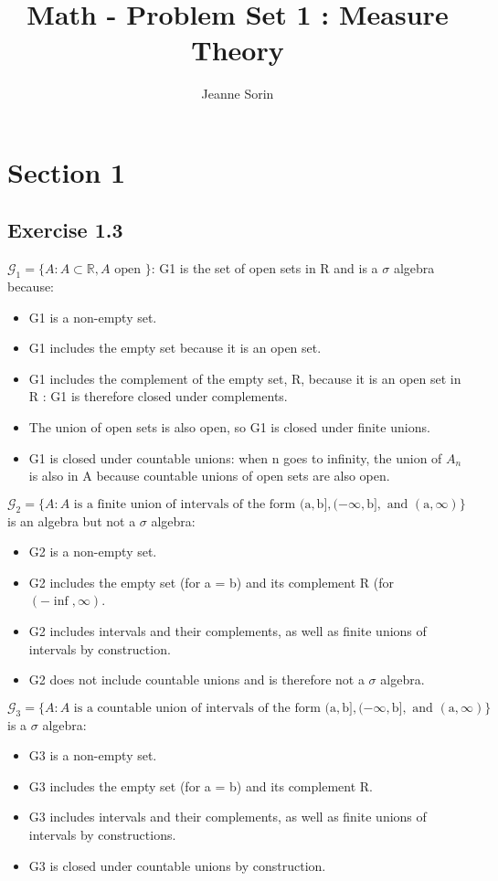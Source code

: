 \documentclass[11pt]{article}
\title{Math - Problem Set 1 : Measure Theory}
\author{Jeanne Sorin}
\numberwithin{equation}{section}
\theoremstyle{plain}
\theoremstyle{definition}
\newcommand{\1}{\mathbbm 1}
\def\s{\sigma}
\begin{document}
\maketitle

\section*{Section 1} %
\label{sec:section_1}

\subsection*{Exercise 1.3} %

\noindent $\mathcal{G}_{1}=\{A : A \subset \mathbb{R}, A \text { open }\}$: G1 is the set of open sets in R and is a $\s$ algebra because:
\begin{itemize}
	\item G1 is a non-empty set.
	\item G1 includes the empty set because it is an open set.
	\item G1 includes the complement of the empty set, R, because it is an open set in R : G1 is therefore closed under complements.
	\item The union of open sets is also open, so G1 is closed under finite unions.
	\item G1 is closed under countable unions: when n goes to infinity, the union of $A_n$ is also in A because countable unions of open sets are also open.
\end{itemize}



\noindent $\mathcal{G}_{2}=\{A : A \text { is a finite union of intervals of the form }(\mathrm{a}, \mathrm{b}],(-\infty, \mathrm{b}], \text { and }(\mathrm{a}, \infty)\}$ is an algebra but not a $\s$ algebra:
\begin{itemize}
	\item G2 is a non-empty set.
	\item G2 includes the empty set (for a = b) and its complement R (for $(-\inf , \infty)$.
	\item G2 includes intervals and their complements, as well as finite unions of intervals by construction.
	\item G2 does not include countable unions and is therefore not a $\s$ algebra.
\end{itemize}



\noindent $\mathcal{G}_{3}=\{A : A \text { is a countable union of intervals of the form }(\mathrm{a}, \mathrm{b}],(-\infty, \mathrm{b}], \text { and }(\mathrm{a}, \infty)\}$ is a $\s$ algebra:
\begin{itemize}
	\item G3 is a non-empty set.
	\item G3 includes the empty set (for a = b) and its complement R.
	\item G3 includes intervals and their complements, as well as finite unions of intervals by constructions.
	\item G3 is closed under countable unions by construction.
\end{itemize}
\end{document}
